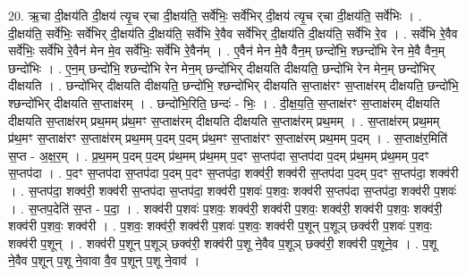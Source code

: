 \documentclass[17pt]{extarticle}
\begin{document}
20. ऋ॒चा दी॒क्षय॑ति दी॒क्षय॑ त्यृ॒च र्‌चा दी॒क्षय॑ति॒ सर्वे॑भिः॒ सर्वे॑भिर् दी॒क्षय॑ त्यृ॒च र्‌चा दी॒क्षय॑ति॒ सर्वे॑भिः । . दी॒क्षय॑ति॒ सर्वे॑भिः॒ सर्वे॑भिर् दी॒क्षय॑ति दी॒क्षय॑ति॒ सर्वे॑भि रे॒वैव सर्वे॑भिर् दी॒क्षय॑ति दी॒क्षय॑ति॒ सर्वे॑भि रे॒व । . सर्वे॑भि रे॒वैव सर्वे॑भिः॒ सर्वे॑भि रे॒वैन॑ मेन मे॒व सर्वे॑भिः॒ सर्वे॑भि रे॒वैन᳚म् । . ए॒वैन॑ मेन मे॒वै वैन॒म् छन्दो॑भि॒ श्छन्दो॑भि रेन मे॒वै वैन॒म् छन्दो॑भिः । . ए॒न॒म् छन्दो॑भि॒ श्छन्दो॑भि रेन मेन॒म् छन्दो॑भिर् दीक्षयति दीक्षयति॒ छन्दो॑भि रेन मेन॒म् छन्दो॑भिर् दीक्षयति । . छन्दो॑भिर् दीक्षयति दीक्षयति॒ छन्दो॑भि॒ श्छन्दो॑भिर् दीक्षयति स॒प्ताक्ष॑रꣳ स॒प्ताक्ष॑रम् दीक्षयति॒ छन्दो॑भि॒ श्छन्दो॑भिर् दीक्षयति स॒प्ताक्ष॑रम् । . छन्दो॑भि॒रिति॒ छन्दः॑ - भिः॒ । . दी॒क्ष॒य॒ति॒ स॒प्ताक्ष॑रꣳ स॒प्ताक्ष॑रम् दीक्षयति दीक्षयति स॒प्ताक्ष॑रम् प्रथ॒मम् प्र॑थ॒मꣳ स॒प्ताक्ष॑रम् दीक्षयति दीक्षयति स॒प्ताक्ष॑रम् प्रथ॒मम् । . स॒प्ताक्ष॑रम् प्रथ॒मम् प्र॑थ॒मꣳ स॒प्ताक्ष॑रꣳ स॒प्ताक्ष॑रम् प्रथ॒मम् प॒दम् प॒दम् प्र॑थ॒मꣳ स॒प्ताक्ष॑रꣳ स॒प्ताक्ष॑रम् प्रथ॒मम् प॒दम् । . स॒प्ताक्ष॑र॒मिति॑ स॒प्त - अ॒क्ष॒र॒म् । . प्र॒थ॒मम् प॒दम् प॒दम् प्र॑थ॒मम् प्र॑थ॒मम् प॒दꣳ स॒प्तप॑दा स॒प्तप॑दा प॒दम् प्र॑थ॒मम् प्र॑थ॒मम् प॒दꣳ स॒प्तप॑दा । . प॒दꣳ स॒प्तप॑दा स॒प्तप॑दा प॒दम् प॒दꣳ स॒प्तप॑दा॒ शक्व॑री॒ शक्व॑री स॒प्तप॑दा प॒दम् प॒दꣳ स॒प्तप॑दा॒ शक्व॑री । . स॒प्तप॑दा॒ शक्व॑री॒ शक्व॑री स॒प्तप॑दा स॒प्तप॑दा॒ शक्व॑री प॒शवः॑ प॒शवः॒ शक्व॑री स॒प्तप॑दा स॒प्तप॑दा॒ शक्व॑री प॒शवः॑ । . स॒प्तप॒देति॑ स॒प्त - प॒दा॒ । . शक्व॑री प॒शवः॑ प॒शवः॒ शक्व॑री॒ शक्व॑री प॒शवः॒ शक्व॑री॒ शक्व॑री प॒शवः॒ शक्व॑री॒ शक्व॑री प॒शवः॒ शक्व॑री । . प॒शवः॒ शक्व॑री॒ शक्व॑री प॒शवः॑ प॒शवः॒ शक्व॑री प॒शून् प॒शूञ् छक्व॑री प॒शवः॑ प॒शवः॒ शक्व॑री प॒शून् । . शक्व॑री प॒शून् प॒शूञ् छक्व॑री॒ शक्व॑री प॒शू ने॒वैव प॒शूञ् छक्व॑री॒ शक्व॑री प॒शूने॒व । . प॒शू ने॒वैव प॒शून् प॒शू ने॒वावा वै॒व प॒शून् प॒शू ने॒वाव॑ । \newline
\end{document}
